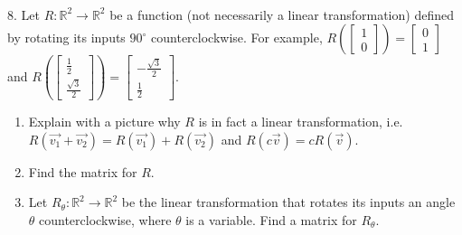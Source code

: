 \documentclass{article}
\begin{document}
~\\

8. Let $R : \mathbb{R}^2 \to \mathbb{R}^2$ be a function (not necessarily a linear transformation) defined by rotating its inputs $90^\circ$ counterclockwise. For example, $R\left( \left[\begin{array}{c} 1 \\ 0 \end{array}\right] \right) = \left[\begin{array}{c} 0 \\ 1 \end{array}\right]$ and $R\left( \left[\begin{array}{c} \frac{1}{2} \\ \frac{\sqrt{3}}{2} \end{array}\right] \right) = \left[\begin{array}{c} -\frac{\sqrt{3}}{2} \\ \frac{1}{2} \end{array}\right]$.

\begin{enumerate}

	\item Explain with a picture why $R$ is in fact a linear transformation, i.e. $R(\vec{v_1} + \vec{v_2}) = R(\vec{v_1}) + R(\vec{v_2})$ and $R(c\vec{v}) = cR(\vec{v})$.

	\item Find the matrix for $R$.

	\item Let $R_\theta : \mathbb{R}^2 \to \mathbb{R}^2$ be the linear transformation that rotates its inputs an angle $\theta$ counterclockwise, where $\theta$ is a variable. Find a matrix for $R_\theta$.

\end{enumerate}
\end{document}
